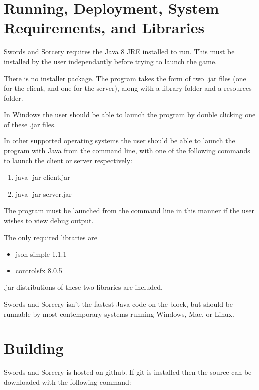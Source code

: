 \documentclass[12pt,a4paper]{article}
\begin{document}
\section{Running, Deployment, System Requirements, and Libraries}
Swords and Sorcery requires the Java 8 JRE installed to run. This must be 
installed by the user independantly before trying to launch the game.

There is no installer package. The program takes the form of two .jar files
(one for the client, and one for the server), along with a library folder and a 
resources folder.

In Windows the user should be
able to launch the program by double clicking one of these .jar files. 

In other supported operating systems the user should be able to launch the
program with Java from the command line, with one of the following commands to
launch the client or server respectively:

\begin{enumerate}
\item{java -jar client.jar}
\item{java -jar server.jar}
\end{enumerate}

The program must be launched from the command line in this manner if the user
wishes to view debug output.

The only required libraries are

\begin{itemize}
	\item json-simple 1.1.1
	\item controlsfx 8.0.5
\end{itemize}

.jar distributions of these two libraries are included.

Swords and Sorcery isn't the fastest Java code on the block, but should be
runnable by most contemporary systems running Windows, Mac, or Linux.

\section{Building}
Swords and Sorcery is hosted on github. If git is installed then the source can
be downloaded with the following command:
\end{document}
